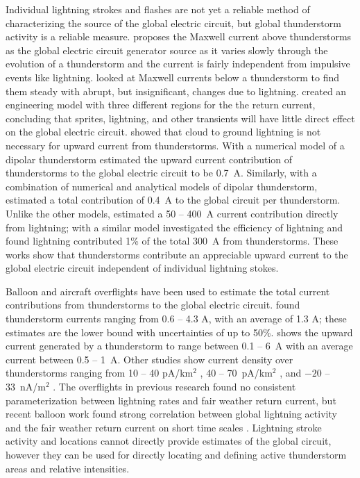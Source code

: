 Individual lightning strokes and flashes are not yet a reliable method of characterizing the source of the global electric circuit, but global thunderstorm activity is a reliable measure.
\citet{Ruhnke1969} proposes the Maxwell current above thunderstorms as the global electric circuit generator source as it varies slowly through the evolution of a thunderstorm and the current is fairly independent from impulsive events like lightning.
\citet{Krider1985} looked at Maxwell currents below a thunderstorm to find them steady with abrupt, but insignificant, changes due to lightning.
\citet{Rycroft2000c} created an engineering model with three different regions for the the return current, concluding that sprites, lightning, and other transients will have little direct effect on the global electric circuit.
\citet{Stergis1957} showed that cloud to ground lightning is not necessary for upward current from thunderstorms. 
With a numerical model of a dipolar thunderstorm \citet{Tzur1985} estimated the upward current contribution of thunderstorms to the global electric circuit to be 0.7~A.
Similarly, with a combination of numerical and analytical models of dipolar thunderstorm, \citet{Driscoll1992} estimated a total contribution of 0.4~A to the global circuit per thunderstorm.
Unlike the other models, \citet{Mareev2008} estimated a 50 -- 400~A current contribution directly from lightning;  with a similar model \citet{Mallios2012} investigated the efficiency of lightning and found lightning contributed 1\% of the total 300~A from thunderstorms.
These works show that thunderstorms contribute an appreciable upward current to the global electric circuit independent of individual lightning stokes.

Balloon and aircraft overflights have been used to estimate the total current contributions from thunderstorms to the global electric circuit.
\citet{Stergis1957} found thunderstorm currents ranging from 0.6 -- 4.3 A, with an average of 1.3 A; these estimates are the lower bound with uncertainties of up to 50\%.
\citet{Blakeslee1989} shows the upward current generated by a thunderstorm to range between 0.1 -- 6~A with an average current between 0.5 -- 1~A.
Other studies show current density over thunderstorms ranging from 10 -- 40 pA/km$^2$ \citep{Holzworth1981}, 40 -- 70~pA/km$^2$ \citep{Rycroft2006}, and $-20$ -- 33~nA/m$^2$ \citep{Mach2009}.
The overflights in previous research found no consistent parameterization between lightning rates and fair weather return current, but recent balloon work found strong correlation between global lightning activity and the fair weather return current on short time scales \citep{Holzworth2005}.
Lightning stroke activity and locations cannot directly provide estimates of the global circuit, however they can be used for directly locating and defining active thunderstorm areas and relative intensities.

